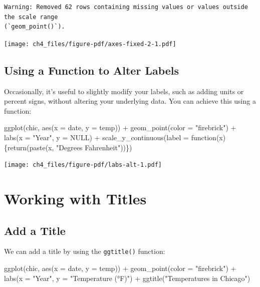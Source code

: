 \documentclass[
  letterpaper,
]{scrbook}
\newenvironment{Shaded}{\begin{snugshade}}{\end{snugshade}}
\newcommand{\AttributeTok}[1]{\textcolor[rgb]{0.40,0.45,0.13}{#1}}
\newcommand{\ConstantTok}[1]{\textcolor[rgb]{0.56,0.35,0.01}{#1}}
\newcommand{\ControlFlowTok}[1]{\textcolor[rgb]{0.00,0.23,0.31}{#1}}
\newcommand{\FunctionTok}[1]{\textcolor[rgb]{0.28,0.35,0.67}{#1}}
\newcommand{\NormalTok}[1]{\textcolor[rgb]{0.00,0.23,0.31}{#1}}
\newcommand{\SpecialCharTok}[1]{\textcolor[rgb]{0.37,0.37,0.37}{#1}}
\newcommand{\StringTok}[1]{\textcolor[rgb]{0.13,0.47,0.30}{#1}}
\begin{document}
\begin{verbatim}
Warning: Removed 62 rows containing missing values or values outside the scale range
(`geom_point()`).
\end{verbatim}

\texttt{[image: ch4\_files/figure-pdf/axes-fixed-2-1.pdf]}

\section{Using a Function to Alter
Labels}\label{using-a-function-to-alter-labels}

Occasionally, it's useful to slightly modify your labels, such as adding
units or percent signs, without altering your underlying data. You can
achieve this using a function:

\begin{Shaded}
\begin{Highlighting}[]
\FunctionTok{ggplot}\NormalTok{(chic, }\FunctionTok{aes}\NormalTok{(}\AttributeTok{x =}\NormalTok{ date, }\AttributeTok{y =}\NormalTok{ temp)) }\SpecialCharTok{+}
  \FunctionTok{geom\_point}\NormalTok{(}\AttributeTok{color =} \StringTok{"firebrick"}\NormalTok{) }\SpecialCharTok{+}
  \FunctionTok{labs}\NormalTok{(}\AttributeTok{x =} \StringTok{"Year"}\NormalTok{, }\AttributeTok{y =} \ConstantTok{NULL}\NormalTok{) }\SpecialCharTok{+}
  \FunctionTok{scale\_y\_continuous}\NormalTok{(}\AttributeTok{label =} \ControlFlowTok{function}\NormalTok{(x) \{}\FunctionTok{return}\NormalTok{(}\FunctionTok{paste}\NormalTok{(x, }\StringTok{"Degrees Fahrenheit"}\NormalTok{))\})}
\end{Highlighting}
\end{Shaded}

\texttt{[image: ch4\_files/figure-pdf/labs-alt-1.pdf]}


\chapter{Working with Titles}\label{titles}

\section{Add a Title}\label{add-a-title}

We can add a title by using the \texttt{ggtitle()} function:

\begin{Shaded}
\begin{Highlighting}[]
\FunctionTok{ggplot}\NormalTok{(chic, }\FunctionTok{aes}\NormalTok{(}\AttributeTok{x =}\NormalTok{ date, }\AttributeTok{y =}\NormalTok{ temp)) }\SpecialCharTok{+}
  \FunctionTok{geom\_point}\NormalTok{(}\AttributeTok{color =} \StringTok{"firebrick"}\NormalTok{) }\SpecialCharTok{+}
  \FunctionTok{labs}\NormalTok{(}\AttributeTok{x =} \StringTok{"Year"}\NormalTok{, }\AttributeTok{y =} \StringTok{"Temperature (°F)"}\NormalTok{) }\SpecialCharTok{+}
  \FunctionTok{ggtitle}\NormalTok{(}\StringTok{"Temperatures in Chicago"}\NormalTok{)}
\end{Highlighting}
\end{Shaded}
\end{document}
